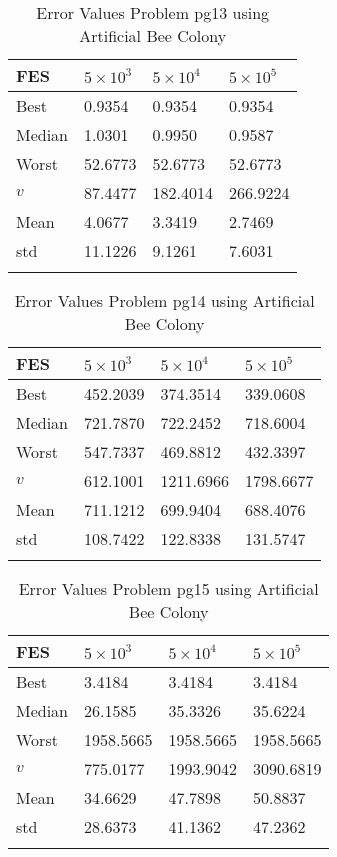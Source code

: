 \documentclass[10pt, a4paper]{book}
\begin{document}
\begin{center}
\begin{longtable}{l l l l}
FES & $5 \times 10^{3}$ & $5 \times 10^{4}$ & $5 \times 10^{5}$ \\
\hline
Best & 0.9354 & 0.9354 & 0.9354 \\
Median & 1.0301 & 0.9950 & 0.9587 \\
Worst & 52.6773 & 52.6773 & 52.6773 \\
$v$ & 87.4477 & 182.4014 & 266.9224 \\
Mean & 4.0677 & 3.3419 & 2.7469 \\
std & 11.1226 & 9.1261 & 7.6031 \\
\caption{ Error Values Problem pg13 using Artificial Bee Colony }
\end{longtable}
\end{center}

\begin{center}
\begin{longtable}{l l l l}
FES & $5 \times 10^{3}$ & $5 \times 10^{4}$ & $5 \times 10^{5}$ \\
\hline
Best & 452.2039 & 374.3514 & 339.0608 \\
Median & 721.7870 & 722.2452 & 718.6004 \\
Worst & 547.7337 & 469.8812 & 432.3397 \\
$v$ & 612.1001 & 1211.6966 & 1798.6677 \\
Mean & 711.1212 & 699.9404 & 688.4076 \\
std & 108.7422 & 122.8338 & 131.5747 \\
\caption{ Error Values Problem pg14 using Artificial Bee Colony }
\end{longtable}
\end{center}

\begin{center}
\begin{longtable}{l l l l}
FES & $5 \times 10^{3}$ & $5 \times 10^{4}$ & $5 \times 10^{5}$ \\
\hline
Best & 3.4184 & 3.4184 & 3.4184 \\
Median & 26.1585 & 35.3326 & 35.6224 \\
Worst & 1958.5665 & 1958.5665 & 1958.5665 \\
$v$ & 775.0177 & 1993.9042 & 3090.6819 \\
Mean & 34.6629 & 47.7898 & 50.8837 \\
std & 28.6373 & 41.1362 & 47.2362 \\
\caption{ Error Values Problem pg15 using Artificial Bee Colony }
\end{longtable}
\end{center}
\end{document}
